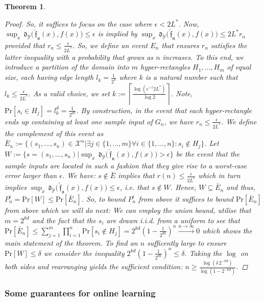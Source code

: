 \documentclass{article} %
\newtheorem{thm}{Theorem}[section]
\theoremstyle{definition}
\theoremstyle{remark}
\newcommand{\ceil}[1]{ \left\lceil #1 \right\rceil }
\newcommand{\inspace}{\ensuremath{ \mathcal X}}
\newcommand{\outspace}{\ensuremath{ \mathcal Y}}
\newcommand{\grid}{\ensuremath{  G}}
\newcommand{\metric}{\, \mathfrak{d}} %
\newcommand{\Metrico}[2]{\metric_\outspace\bigl(#1,#2\bigr) }
\newcommand{\predfn}{\, \mathfrak{  \hat f_n}} %
\renewcommand{\Pr}{\mathrm{Pr}}
\newcommand{\convto}{\longrightarrow}
\begin{document}
\begin{thm}
\begin{proof}
So, it suffices to focus on the case where $\epsilon < 2 L^*$. Now, $\sup_x \Metrico{\predfn(x)}{f(x)} \leq \epsilon  $ is implied by $\sup_x \Metrico{\predfn(x)}{f(x)} \leq 2 L^* r_n $ provided that $  r_n  \leq \frac {\epsilon}{2 L^*}$. So, we define an event $E_n$ that ensures $r_n$ satisfies the latter inequality with a probability that grows as $n$ increases.
To this end, we introduce a partition of the domain into $m$ hyper-rectangles $H_1,...,H_m$ of equal size, each having edge length $l_k=\frac 1 {2^k}$ where $k$ is a natural number such that $l_k \leq  \frac {\epsilon}{2 L^*} $. As a valid choice, we set $k:= \ceil{\frac{\log(\epsilon^{-1}2 L^*)}{\log 2}}$. Note, $\Pr[s_i \in H_j] = l_k^d = \frac{1}{2^{dk}}$.  By construction, in the event that each hyper-rectangle ends up containing at least one sample input of $\grid_n$, we have  $r_n \leq \frac {\epsilon}{2 L^*}$. 
We define the complement of this event as $\bar E_n := \{(s_1,...,s_n)  \in \inspace^n | \exists j \in \{1,...,m\} \forall i \in \{1,...,n\}: s_i \notin H_j  \}$. Let  $W:= \{ s=(s_1,...,s_n)  | \sup_x \Metrico{\predfn(x)}{f(x)} > \epsilon \}$ be the event that the sample inputs are located in such a fashion that they give rise to a worst-case error larger than $\epsilon$.  We have: $s \notin \bar E$ implies that $r(n) \leq \frac {\epsilon}{2 L^*} $ which in turn implies $\sup_x \Metrico{\predfn(x)}{f(x)} \leq \epsilon $, i.e. that $s \notin W$. Hence, $W \subseteq \bar E_n$ and thus, $ P_n^\epsilon =\Pr[W] \leq \Pr[\bar E_n]$.
So, to bound $P_n^\epsilon$ from above it suffices to bound $\Pr[\bar E_n]$ from above which we will do next: We can employ the union bound, utilise that $m = 2^{kd}$ and the fact that the $s_i$ are drawn i.i.d. from a uniform to see that $\Pr[\bar E_n] \leq \sum_{j=1}^m \prod_{i=1}^n \Pr[s_i \notin H_j] = 2^{kd}  (1-\frac{1}{2^{dk}})^n \stackrel{n \to \infty}{\convto} 0$ which shows the main statement of the theorem. To find an $n$ sufficently large to ensure $\Pr[W] \leq \delta$ we consider the inequality $2^{kd}  (1-\frac{1}{2^{dk}})^n \leq \delta$. Taking the $\log$ on both sides and rearranging yields the sufficient condition: $n \geq \frac{ \log(\delta \, 2^{-kd}  )}{\log(1- 2^{-kd})}$. 
\end{proof}
\end{thm}



\subsubsection{Some guarantees for online learning}
\end{document}
